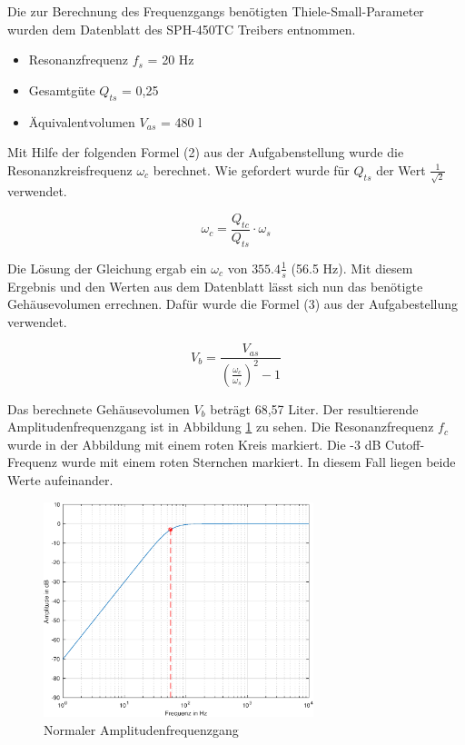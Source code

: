 Die zur Berechnung des Frequenzgangs benötigten Thiele-Small-Parameter wurden dem Datenblatt \cite{SPH-450TC} des SPH-450TC Treibers entnommen.

\begin{itemize}
  \item Resonanzfrequenz $f_s$ = 20 Hz
  \item Gesamtgüte $Q_{ts}$ = 0,25
  \item Äquivalentvolumen $V_{as}$ = 480 l
\end{itemize}

Mit Hilfe der folgenden Formel (2) aus der Aufgabenstellung wurde die Resonanzkreisfrequenz $\omega_c$ berechnet.
Wie gefordert wurde für $Q_{ts}$ der Wert $\frac{1}{\sqrt{2}}$ verwendet.

\[
\omega_c = \frac{Q_{tc}}{Q_{ts}} \cdot \omega_s 
\]

Die Lösung der Gleichung ergab ein $\omega_c$ von $355.4 \frac{1}{s}$ (56.5 Hz). 
Mit diesem Ergebnis und den Werten aus dem Datenblatt lässt sich nun das benötigte Gehäusevolumen errechnen.
Dafür wurde die Formel (3) aus der Aufgabestellung verwendet.

\[
V_b = \frac{V_{as}} {\left( \frac{\omega_c}{\omega_s} \right) ^{2} - 1}
\]

Das berechnete Gehäusevolumen  $V_b$ beträgt 68,57 Liter.
Der resultierende Amplitudenfrequenzgang ist in Abbildung \ref{fig:Normaler_Frequenzgang} zu sehen.
Die Resonanzfrequenz $f_c$ wurde in der Abbildung mit einem roten Kreis markiert. 
Die -3 dB Cutoff-Frequenz wurde mit einem roten Sternchen markiert.
In diesem Fall liegen beide Werte aufeinander.

\begin{figure}[H]
    \centering
    \includegraphics[width=0.7\textwidth]{Figures/Normaler_Frequenzgang.eps}
    \caption{Normaler Amplitudenfrequenzgang}
    \label{fig:Normaler_Frequenzgang}
\end{figure}%

